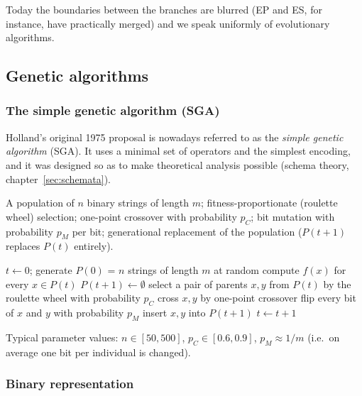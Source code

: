 \documentclass[11pt,a4paper]{article}
\theoremstyle{definition}
\begin{document}
Today the boundaries between the branches are blurred (EP and ES, for instance,
have practically merged) and we speak uniformly of evolutionary algorithms.

\subsection{Genetic algorithms}
\label{ssec:sga}
\subsubsection{The simple genetic algorithm (SGA)}

Holland's original 1975 proposal is nowadays referred to as the \emph{simple
genetic algorithm} (SGA). It uses a minimal set of operators and the simplest
encoding, and it was designed so as to make theoretical analysis possible
(schema theory, chapter~\ref{sec:schemata}).

\begin{defbox}[SGA]
A population of $n$ binary strings of length $m$; fitness-proportionate
(roulette wheel) selection; one-point crossover with probability $p_C$; bit
mutation with probability $p_M$ per bit; generational replacement of the
population ($P(t+1)$ replaces $P(t)$ entirely).
\end{defbox}

\begin{algorithm}[!ht]
\caption{Simple genetic algorithm (SGA)}
\begin{algorithmic}[1]
\State $t \gets 0$; generate $P(0)$ = $n$ strings of length $m$ at random
  \State compute $f(x)$ for every $x \in P(t)$
  \State $P(t+1) \gets \emptyset$
    \State select a pair of parents $x, y$ from $P(t)$ by the roulette wheel
    \State with probability $p_C$ cross $x, y$ by one-point crossover
    \State flip every bit of $x$ and $y$ with probability $p_M$
    \State insert $x, y$ into $P(t+1)$
  \EndFor
  \State $t \gets t+1$
\EndWhile
\end{algorithmic}
\end{algorithm}

Typical parameter values: $n \in [50, 500]$, $p_C \in [0.6, 0.9]$,
$p_M \approx 1/m$ (i.e.\ on average one bit per individual is changed).

\subsubsection{Binary representation}
\end{document}
